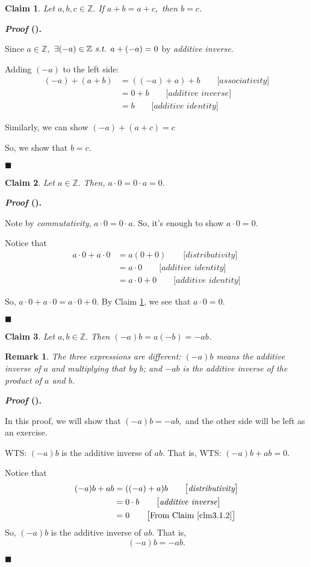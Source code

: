 \documentclass[12pt,a4paper]{article}
\newtheorem{clm}{Claim}[subsection]
\newcounter{nprf}[subsection]
\newtheorem*{rmk}{\indent Remark}
\newenvironment*{prf}{\par\indent\textbf{\textit{Proof} (\stepcounter{nprf}\thenprf). }\par}{\par\hfill $\blacksquare$\par}
\def\Z{{\mathbb{Z}}}
\def\st{\emph{ s.t. }}
\begin{document}
\begin{framed}
\begin{clm}\label{clm3.1.1}
	Let $a,b,c\in\Z.$ If $a+b=a+c,$ then $b=c$.
\end{clm}
\begin{prf}
	Since $a\in\Z,$ $\exists (-a)\in\Z\st a+(-a)=0$ by \textit{additive inverse}.\par Adding $(-a)$ to the left side: \[\begin{aligned}(-a)+(a+b)&=((-a)+a)+b\qquad\big[\textit{associativity}\big]\\&=0+b\qquad\big[\textit{additive inverse}\big]\\&=b\qquad\big[\textit{additive identity}\big]\end{aligned}\]\par Similarly, we can show $(-a)+(a+c)=c$\par So, we show that $b=c.$
\end{prf}
\end{framed}
\begin{framed}
\begin{clm}\label{clm3.1.2}
	Let $a\in\Z.$ Then, $a\cdot0=0\cdot a=0$.
\end{clm}
\begin{prf}
	Note by \textit{commutativity}, $a\cdot0=0\cdot a$. So, it's enough to show $a\cdot0=0.$\par Notice that \[\begin{aligned}a\cdot0+a\cdot0&=a(0+0)\qquad\big[\textit{distributivity}\big]\\&=a\cdot0\qquad\big[\textit{additive identity}\big]\\&=a\cdot0+0\qquad\big[\textit{additive identity}\big]\end{aligned}\]\par So, $a\cdot0+a\cdot0=a\cdot0+0.$ By Claim \ref{clm3.1.1}, we see that $a\cdot0=0.$
\end{prf}
\end{framed}
\begin{framed}
\begin{clm}
	Let	$a,b\in\Z.$ Then $(-a)b=a(-b)=-ab$.
\end{clm}
\begin{rmk}
	The three expressions are different: $(-a)b$ means the additive inverse of $a$ and multiplying that by $b$; and $-ab$ is the additive inverse of the product of $a$ and $b$.	
\end{rmk}
\begin{prf}	
	In this proof, we will show that $(-a)b=-ab,$ and the other side will be left as an exercise.\par WTS: $(-a)b$ is the additive inverse of $ab$. That is, WTS: $(-a)b+ab=0.$\par Notice that \[\begin{aligned}(-a)b+ab&=((-a)+a)b\qquad\big[\textit{distributivity}\big]\\&=0\cdot b\qquad\big[\textit{additive inverse}\big]\\&=0\qquad\big[\text{From Claim \ref{clm3.1.2}}\big]\end{aligned}\] So, $(-a)b$ is the additive inverse of $ab$. That is, \[(-a)b=-ab.\]
\end{prf}
\end{framed}
\end{document}

